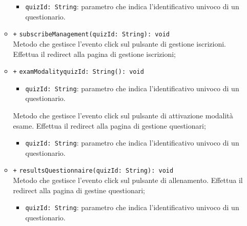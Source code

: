 \begin{itemize}
\begin{itemize}
\begin{itemize}
										\item \texttt{quizId: String}: parametro che indica l'identificativo univoco di un questionario.
									\end{itemize}
									\item \texttt{+} \texttt{subscribeManagement(quizId: String): void} \\
									Metodo che gestisce l’evento click sul pulsante di gestione iscrizioni. Effettua il redirect alla pagina di gestione iscrizioni;
									\item \texttt{+} \texttt{examModalityquizId: String(): void} \\
									\begin{itemize}
										\item \texttt{quizId: String}: parametro che indica l'identificativo univoco di un questionario.
									\end{itemize}
									Metodo che gestisce l’evento click sul pulsante di attivazione modalità esame. Effettua il redirect alla pagina di gestione questionari;
									\begin{itemize}
										\item \texttt{quizId: String}: parametro che indica l'identificativo univoco di un questionario.
									\end{itemize}
									\item \texttt{+} \texttt{resultsQuestionnaire(quizId: String): void} \\
									Metodo che gestisce l’evento click sul pulsante di allenamento. Effettua il redirect alla pagina di gestine questionari;
									\begin{itemize}
										\item \texttt{quizId: String}: parametro che indica l'identificativo univoco di un questionario.
									\end{itemize}   
								\end{itemize}
							\end{itemize}